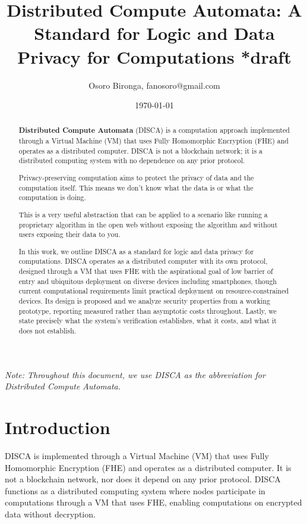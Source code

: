 \documentclass[12pt,a4paper]{article}
\title{Distributed Compute Automata: A Standard for Logic and Data Privacy for Computations *draft}
\author{Osoro Bironga, fanosoro@gmail.com}
\date{\today}
\begin{document}
\maketitle

\begin{abstract}
\centering
\begin{minipage}{0.8\textwidth}
\centering
\textbf{Distributed Compute Automata} (DISCA) is a computation approach implemented through a Virtual Machine (VM) that uses Fully Homomorphic Encryption (FHE) and operates as a distributed computer.
DISCA is not a blockchain network; it is a distributed computing system with no dependence on any prior protocol.

Privacy-preserving computation aims to protect the privacy of data and the computation itself. This means we don't know what the data is or what the computation is doing. 

This is a very useful abstraction that can be applied to a scenario like running a proprietary algorithm in the open web without exposing the algorithm and without users exposing their data to you.

In this work, we outline DISCA as a standard for logic and data privacy for computations.
DISCA operates as a distributed computer with its own protocol, designed through a VM that uses FHE with the aspirational goal of low barrier of entry and ubiquitous deployment on diverse devices including smartphones, though current computational requirements limit practical deployment on resource-constrained devices.
Its design is proposed and we analyze security properties from a working prototype, reporting measured rather than asymptotic costs throughout.
Lastly, we state precisely what the system's verification establishes, what it costs, and what it does not establish.
\end{minipage}
\end{abstract}

\noindent\textit{Note: Throughout this document, we use DISCA as the abbreviation for Distributed Compute Automata.}

\section{Introduction}

DISCA is implemented through a Virtual Machine (VM) that uses Fully Homomorphic Encryption (FHE) and operates as a distributed computer.
It is not a blockchain network, nor does it depend on any prior protocol.
DISCA functions as a distributed computing system where nodes participate in computations through a VM that uses FHE, enabling computations on encrypted data without decryption.
\end{document}
